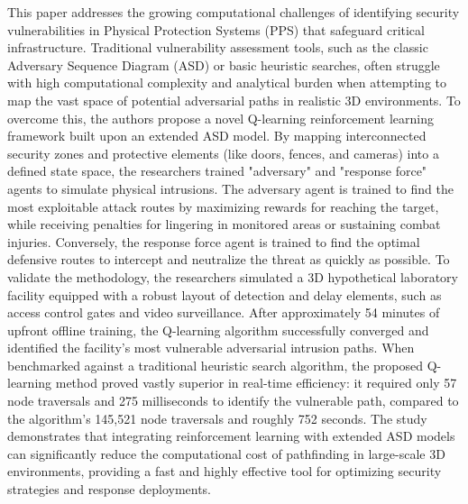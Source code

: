 \documentclass{article}
\begin{document}
This paper addresses the growing computational challenges of identifying security vulnerabilities in Physical Protection Systems (PPS) that safeguard critical infrastructure. Traditional vulnerability assessment tools, such as the classic Adversary Sequence Diagram (ASD) or basic heuristic searches, often struggle with high computational complexity and analytical burden when attempting to map the vast space of potential adversarial paths in realistic 3D environments. To overcome this, the authors propose a novel Q-learning reinforcement learning framework built upon an extended ASD model. By mapping interconnected security zones and protective elements (like doors, fences, and cameras) into a defined state space, the researchers trained "adversary" and "response force" agents to simulate physical intrusions. The adversary agent is trained to find the most exploitable attack routes by maximizing rewards for reaching the target, while receiving penalties for lingering in monitored areas or sustaining combat injuries. Conversely, the response force agent is trained to find the optimal defensive routes to intercept and neutralize the threat as quickly as possible.
\newline
To validate the methodology, the researchers simulated a 3D hypothetical laboratory facility equipped with a robust layout of detection and delay elements, such as access control gates and video surveillance. After approximately 54 minutes of upfront offline training, the Q-learning algorithm successfully converged and identified the facility's most vulnerable adversarial intrusion paths. When benchmarked against a traditional heuristic search algorithm, the proposed Q-learning method proved vastly superior in real-time efficiency: it required only 57 node traversals and 275 milliseconds to identify the vulnerable path, compared to the algorithm's 145,521 node traversals and roughly 752 seconds. The study demonstrates that integrating reinforcement learning with extended ASD models can significantly reduce the computational cost of pathfinding in large-scale 3D environments, providing a fast and highly effective tool for optimizing security strategies and response deployments.
\end{document}
